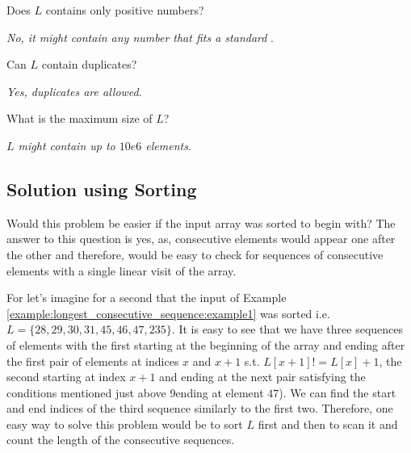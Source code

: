 \begin{QandA}
	\item Does $L$ contains only positive numbers?
	\begin{answered}
		\textit{No, it might contain any number that fits a standard }.
	\end{answered}

	\item Can $L$ contain duplicates?
	\begin{answered}
		\textit{Yes, duplicates are allowed}.
	\end{answered}

	\item What is the maximum size of $L$?
	\begin{answered}
		\textit{$L$ might contain up to $10e6$ elements}.
	\end{answered}
	
\end{QandA}

\subsection{Solution using Sorting}
\label{longest_consecutive_sequence:sec:bruteforce}
Would this problem be easier if the input array was sorted to begin with? 
The answer to this question is yes, as, consecutive elements would appear one after the other and therefore, would be easy to check for sequences of consecutive elements with a single linear visit of the array.

For let's imagine for a second that the input of  Example \ref{example:longest_consecutive_sequence:example1} was sorted i.e. $L=\{28,29,30,31,45,46,47,235\}.$ It is easy to see that we have three sequences of elements with the first starting at the beginning of the array and ending after the first pair of elements at indices $x$ and $x+1$ s.t. $L[x+1]!= L[x]+1$, the second starting at index $x+1$ and ending at the next pair satisfying the conditions mentioned just above 9ending at element $47$). We can find the start and end indices of the third sequence similarly to the first two.
Therefore, one easy way to solve this problem would be to sort $L$ first and then to scan it and count the length of the consecutive sequences. 


